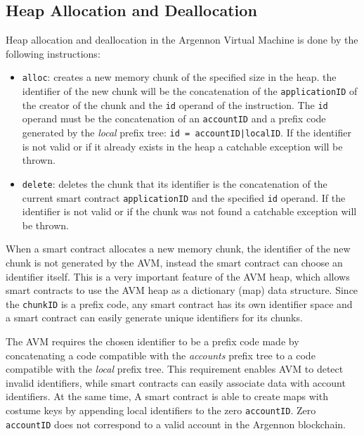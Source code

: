 \subsection{Heap Allocation and Deallocation}\label{subsec:heap-allocation-instructions}

Heap allocation and deallocation in the Argennon Virtual Machine is done by the following instructions:

\begin{itemize}
    \item \texttt{alloc}: creates a new memory chunk of the specified size in the heap. the identifier
    of the new chunk will be the concatenation of the \texttt{applicationID} of the creator of the chunk and
    the \texttt{id} operand of the instruction. The \texttt{id} operand must be the concatenation of
    an \texttt{accountID} and a prefix code
    generated by the \emph{local} prefix tree: \texttt{id = accountID|localID}. If the identifier is not valid or
    if it already exists in the heap a catchable exception will be thrown.

    \item \texttt{delete}: deletes the chunk that its identifier is the concatenation of the current smart
    contract \texttt{applicationID} and the specified \texttt{id} operand. If the identifier is not valid or
    if the chunk was not found a catchable exception will be thrown.
\end{itemize}

When a smart contract allocates a new memory chunk, the identifier of the new chunk is not generated by
the AVM, instead the smart contract can choose an identifier itself. This is a very important feature of
the AVM heap, which allows smart contracts to use the AVM heap as a dictionary (map) data structure.
Since the \texttt{chunkID} is a prefix code, any smart contract has its own identifier space and a smart contract
can easily generate unique identifiers for its chunks.

The AVM requires the chosen identifier to be a prefix code made by concatenating a code compatible with
the \emph{accounts} prefix tree to a code compatible with the \emph{local} prefix tree. This requirement
enables AVM to detect invalid identifiers, while smart contracts can easily associate data with account identifiers.
At the same time, A smart contract is able to create maps with costume keys by appending local identifiers
to the zero \texttt{accountID}. Zero \texttt{accountID} does not correspond to a valid account in the Argennon
blockchain.


